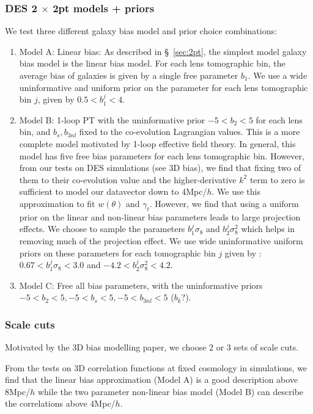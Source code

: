 \documentclass[fleqn,usenatbib]{mnras}
\begin{document}
\subsubsection{DES 2 $\times$ 2pt models + priors}
\label{sec:2x2pt_models}
We test three different galaxy bias model and prior choice combinations:
\begin{enumerate}
    \item Model A: Linear bias: As described in \S~\ref{sec:2pt}, the simplest model galaxy bias model is the  linear bias model. For each lens tomographic bin, the average bias of galaxies is given by a single free parameter $b_1$. We use a wide uninformative and uniform prior on the parameter for each lens tomographic bin $j$, given by $0.5 < b^{j}_1 < 4$. 
    \item Model B: 1-loop PT with the uninformative prior $-5<b_2<5$ for each lens bin, and $b_s, b_{3nl}$ fixed to the co-evolution Lagrangian values. This is a more complete model motivated by 1-loop effective field theory. In general, this model has five free bias parameters for each lens tomographic bin. However, from our tests on DES simulations (see 3D bias), we find that fixing two of them to their co-evolution value and the higher-derivative $k^2$ term to zero is sufficient to model our datavector down to 4Mpc/$h$. We use this  approximation to fit $w(\theta)$ and $\gamma_t$. However, we find that using a uniform prior on the linear and non-linear bias parameters leads to large projection effects. We choose to sample the parameters $b^{j}_1 \sigma_8$ and $b^{j}_2 \sigma^2_8$ which helps in removing much of the projection effect. We use wide uninformative uniform priors on these parameters for each tomographic bin $j$ given by : $0.67 < b^{j}_1 \sigma_8 < 3.0$ and $-4.2 < b^{j}_2 \sigma^2_8 < 4.2$. 
    \item Model C: Free all bias parameters, with the uninformative priors $-5<b_2<5, -5<b_s<5, -5<b_{3nl}<5$ ($b_k$?).
\end{enumerate}

\subsubsection{Scale cuts}
Motivated by the 3D bias modelling paper, we choose 2 or 3 sets of scale cuts.

From the tests on 3D correlation functions at fixed cosmology in simulations, we find that the linear bias approximation (Model A) is a good description above 8Mpc/$h$ while the two parameter non-linear bias model (Model B) can describe the correlations above 4Mpc/$h$.
\end{document}

